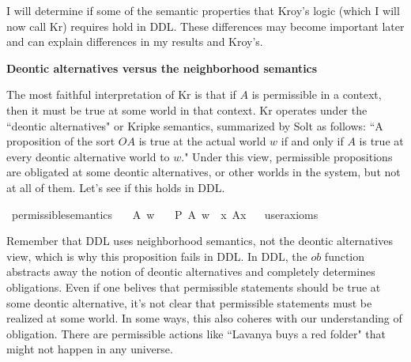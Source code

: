 \begin{isabellebody}
\begin{isamarkuptext}
I will determine if some of the semantic properties that Kroy's logic (which I will now call Kr) requires 
hold in DDL. These differences may become important later and can explain differences in my results and 
Kroy's.%
\end{isamarkuptext}\isamarkuptrue%
%
\begin{isamarkuptext}%
\textbf{Deontic alternatives versus the neighborhood semantics}%
\end{isamarkuptext}\isamarkuptrue%
%
\begin{isamarkuptext}%
The most faithful interpretation of Kr is that if $A$ is permissible in a context, then 
it must be true at some world in that context. Kr operates under the ``deontic alternatives" or Kripke semantics, 
summarized by Solt \cite{solt} as follows: ``A proposition of the sort $O A$ is true at the actual world $w$ if and
only if $A$ is true at every deontic alternative world to $w$." Under this view, permissible propositions
are obligated at some deontic alternatives, or other worlds in the system, but not at all of them. Let's 
see if this holds in DDL.%
\end{isamarkuptext}\isamarkuptrue%
\isamarkupfalse%
\ permissible{\isacharunderscore}semantics{\isacharcolon}\isanewline
\ \ \ A\ w\isanewline
\ \ \ {\isachardoublequoteopen}{\isacharparenleft}P\ {\isacharbraceleft}A{\isacharbraceright}{\isacharparenright}\ w\ {\isasymlongrightarrow}\ {\isacharparenleft}{\isasymexists}x{\isachardot}\ A{\isacharparenleft}x{\isacharparenright}{\isacharparenright}{\isachardoublequoteclose}\isanewline
\ \ \isamarkupfalse%
{\isacharbrackleft}user{\isacharunderscore}axioms{\isacharbrackright}%
\isadelimproof
\ %
\endisadelimproof
%
\isatagproof
{}\isamarkupfalse%
\isanewline
%
%
\endisatagproof
{\isafoldproof}%
%
\isadelimproof
%
\endisadelimproof
%
\begin{isamarkuptext}%
Remember that DDL uses neighborhood semantics, not the deontic alternatives view, which is why this
 proposition fails in DDL. In DDL, the $ob$ function abstracts away the notion of
 deontic alternatives and completely determines obligations. Even if one belives that permissible 
statements should be true at some deontic alternative, it's not clear that permissible statements
 must be realized at some world. In some ways, this also coheres with our understanding of obligation. There 
are permissible actions like ``Lavanya buys a red folder" that might not happen in any universe.


\end{isamarkuptext}
\end{isabellebody}
